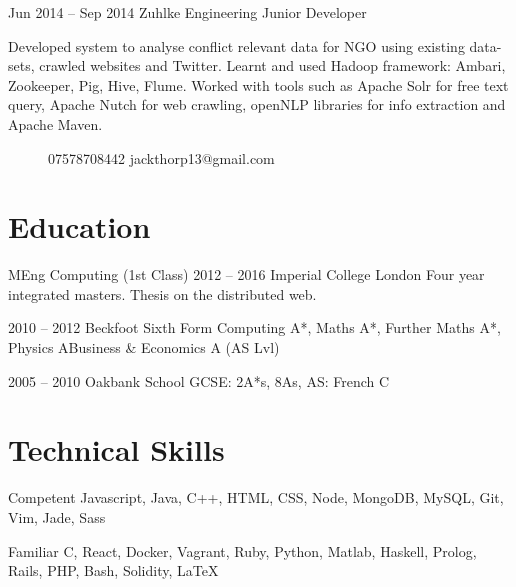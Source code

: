 \documentclass[fontsize=10pt]{tccv}
\begin{document}
\begin{eventlist}
\item{Jun 2014 -- Sep 2014}
     {Zuhlke Engineering}
     {Junior Developer}

Developed system to analyse conflict relevant data for NGO using existing data-sets, crawled websites and Twitter. Learnt and used Hadoop framework: Ambari, Zookeeper, Pig, Hive, Flume. Worked with tools such as Apache Solr for free text query, Apache Nutch for web crawling, openNLP libraries for info extraction and Apache Maven.
\end{eventlist}

\begin{figure}[t] %
    {07578708442}
    {jackthorp13@gmail.com}
\end{figure}

\section{Education}

\begin{yearlist}

\item[MEng Computing (1st Class)]{2012 -- 2016}
     {Imperial College London}
     {Four year integrated masters. Thesis on the distributed web.}

\item[]{2010 -- 2012}
     {Beckfoot Sixth Form}
     {Computing A*, Maths A*, Further Maths A*, Physics A\newline Business \& Economics A (AS Lvl)}
     
\item[]{2005 -- 2010}
     {Oakbank School}
     {GCSE: 2A*s, 8As,  AS: French C}

\end{yearlist}


\section{Technical Skills}

\begin{factlist}

\item{Competent}
     {Javascript, Java, C++, HTML, CSS, Node, MongoDB, MySQL, Git, Vim, Jade, Sass}

\item{Familiar}
     {C, React, Docker, Vagrant, Ruby, Python, Matlab, Haskell, Prolog, Rails, PHP, Bash, Solidity, \LaTeX}

\end{factlist}
\end{document}
